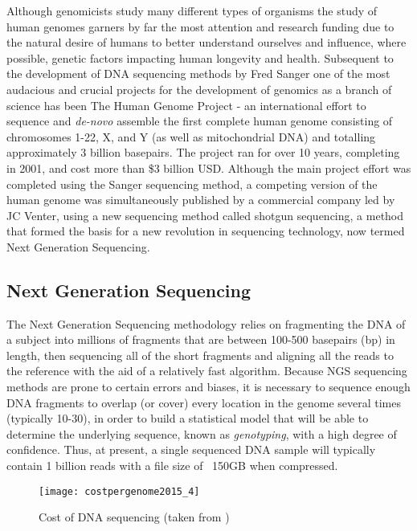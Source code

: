 Although genomicists study many different types of organisms the study of human genomes garners by far the most attention and research funding due to the natural desire of humans to better understand ourselves and influence, where possible, genetic factors impacting human longevity and health. Subsequent to the development of DNA sequencing methods by Fred Sanger one of the most audacious and crucial projects for the development of genomics as a branch of science has been The Human Genome Project\autocite{lander2001initial} - an international effort to sequence and \emph{de-novo} assemble the first complete human genome consisting of chromosomes 1-22, X, and Y (as well as mitochondrial DNA) and totalling approximately 3 billion basepairs. The project ran for over 10 years, completing in 2001, and cost more than \$3 billion USD. Although the main project effort was completed using the Sanger sequencing method, a competing version of the human genome was simultaneously published by a commercial company led by JC Venter\autocite{venter2001sequence}, using a new sequencing method called shotgun sequencing\autocite{venter1998shotgun}, a method that formed the basis for a new revolution in sequencing technology, now termed Next Generation Sequencing\autocite{schuster2007next}.

\subsection{Next Generation Sequencing}
The Next Generation Sequencing methodology\autocite{mardis2008next} relies on fragmenting the DNA of a subject into millions of fragments that are between 100-500 basepairs (bp) in length, then sequencing all of the short fragments and aligning all the reads to the reference with the aid of a relatively fast algorithm\autocite{li2010survey}. Because NGS sequencing methods are prone to certain errors and biases\autocite{dohm2008substantial}, it is necessary to sequence enough DNA fragments to overlap (or cover) every location in the genome several times (typically 10-30), in order to build a statistical model that will be able to determine the underlying sequence, known as \emph{genotyping}\autocite{nielsen2011genotype}, with a high degree of confidence. Thus, at present, a single sequenced DNA sample will typically contain 1 billion reads with a file size of ~150GB when compressed.

\begin{figure}[H]
\texttt{[image: costpergenome2015\_4]}
\centering
\caption {Cost of DNA sequencing (taken from \autocite{The_Cost_of_Sequencing_a_Human_Genome_2016-11-04})}
\label{fig:costpergenome2015_4}
\end{figure}

